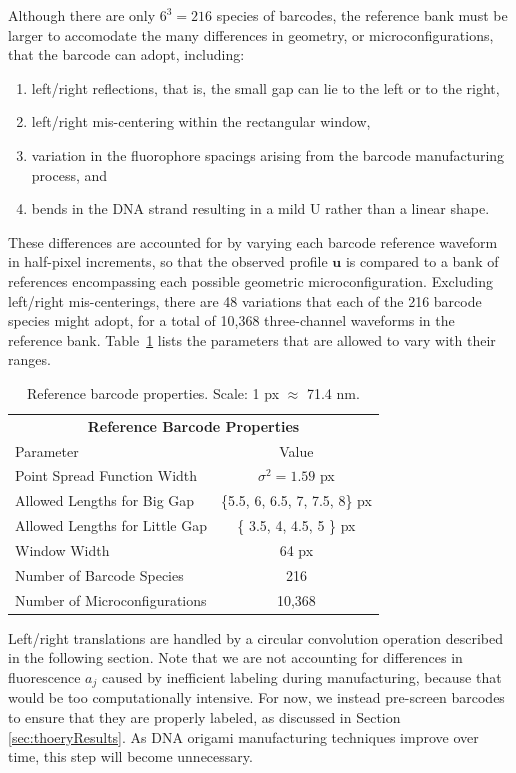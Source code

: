 Although there are only $6^3=216$ species of barcodes, the reference bank must be larger to accomodate the many differences in geometry, or microconfigurations, that the barcode can adopt, including:
\begin{enumerate}
\item left/right reflections, that is, the small gap can lie to the left or to the right,
\item left/right mis-centering within the rectangular window,
\item variation in the fluorophore spacings arising from the barcode manufacturing process, and
\item bends in the DNA strand resulting in a mild U rather than a linear shape.
\end{enumerate}
These differences are accounted for by varying each barcode reference waveform in half-pixel increments, so that the observed profile $\mathbf{u}$ is compared to a bank of references encompassing each possible geometric microconfiguration. Excluding left/right mis-centerings, there are 48 variations that each of the 216 barcode species might adopt, for a total of 10,368 three-channel waveforms in the reference bank. Table~\ref{table:reference} lists the parameters that are allowed to vary with their ranges.

\begin{table}[htbp] 	
\begin{center}
\begin{tabular}{l c}
\multicolumn{2}{c}{\textbf{Reference Barcode Properties}}\\
Parameter & Value \\
\hline
Point Spread Function Width  & $\sigma^2=1.59$ px \\
Allowed Lengths for Big Gap &  \{5.5, 6, 6.5, 7, 7.5, 8\} px \\
Allowed Lengths for Little Gap  & \{ 3.5, 4, 4.5, 5 \} px\\
Window Width & 64 px\\
Number of Barcode Species & 216 \\
Number of Microconfigurations & 10,368 \\
\hline
\end{tabular}
\caption{Reference barcode properties. Scale: 1 px $\approx$ 71.4 nm.\label{table:reference}}
\end{center}
\end{table}

Left/right translations are handled by a circular convolution operation described in the following section.  Note that we are not accounting for differences in fluorescence $a_j$ caused by inefficient labeling during manufacturing,  because that would be too computationally intensive. For now, we instead pre-screen barcodes to ensure that they are properly labeled, as discussed in Section  \ref{sec:thoeryResults}. As DNA origami manufacturing techniques improve over time, this step will become unnecessary. 

